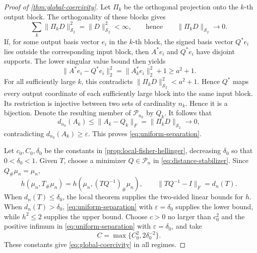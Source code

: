 \begin{proof}[Proof of \cref{thm:global-coercivity}]
Let \(\Pi_k\) be the orthogonal projection onto the \(k\)-th output block.
The orthogonality of these blocks gives
\[
 \sum_k\|\Pi_kD\|_{\mathcal S_2}^2=\|D\|_{\mathcal S_2}^2<\infty,
 \qquad\text{hence}\qquad
 \|\Pi_kD\|_{\mathcal S_2}\longrightarrow0.
 \]
If, for some output basis vector \(e_i\) in the \(k\)-th block, the signed
basis vector \(Q^*e_i\) lies outside the corresponding input block, then
\(A^*e_i\) and \(Q^*e_i\) have disjoint supports.
The lower singular value bound then yields
\begin{equation}
 \|A^*e_i-Q^*e_i\|_2^2
 =\|A_k^*e_i\|_2^2+1\ge a^2+1.
 \label{eq:row-escape-cost}
 \end{equation}
For all sufficiently large \(k\), this contradicts
\(\|\Pi_kD\|_{\mathcal S_2}^2<a^2+1\).
Hence \(Q^*\) maps every output coordinate of each sufficiently large block
into the same input block.
Its restriction is injective between two sets of cardinality \(n_k\).
Hence it is a bijection.
Denote the resulting member of \(\mathcal P_{n_k}\) by
\(Q_k\).  It follows that
\[
 d_{n_k}(A_k)
 \le\|A_k-Q_k\|_F
 =\|\Pi_kD\|_{\mathcal S_2}\longrightarrow0,
\]
contradicting \(d_{n_k}(A_k)\ge\varepsilon\).  This proves
\eqref{eq:uniform-separation}.

Let \(c_0,C_0,\delta_0\) be the constants in
\cref{prop:local-fisher-hellinger}, decreasing \(\delta_0\) so that
\(0<\delta_0<1\).  Given \(T\), choose a minimizer
\(Q\in\mathcal P_n\) in \eqref{eq:distance-stabilizer}.  Since
\(Q_\#\mu_n=\mu_n\),
\[
 h(\mu_n,T_\#\mu_n)
 =h(\mu_n,(TQ^{-1})_\#\mu_n),
 \qquad
 \|TQ^{-1}-I\|_F=d_n(T).
\]
When \(d_n(T)\le\delta_0\), the local theorem supplies the two-sided
linear bounds for \(h\).  When \(d_n(T)>\delta_0\),
\eqref{eq:uniform-separation} with
\(\varepsilon=\delta_0\) supplies the lower bound, while \(h^2\le2\)
supplies the upper bound.  Choose $c>0$ no larger than $c_0^2$ and
the positive infimum in \eqref{eq:uniform-separation} with
$\varepsilon=\delta_0$, and take
\[
 C=\max\{C_0^2,2\delta_0^{-2}\}.
\]
These constants give \eqref{eq:global-coercivity} in all regimes.
\end{proof}
